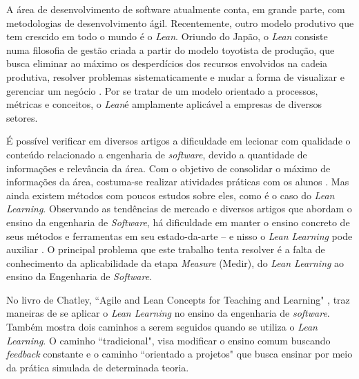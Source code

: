 A área de desenvolvimento de software atualmente conta, em grande parte, com metodologias de desenvolvimento ágil. Recentemente, outro modelo produtivo que tem crescido em todo o mundo é o \textit{Lean}. Oriundo do Japão, o \textit{Lean} consiste numa filosofia de gestão criada a partir do modelo toyotista de produção, que busca eliminar ao máximo os desperdícios dos recursos envolvidos na cadeia produtiva, resolver problemas sistematicamente e mudar a forma de visualizar e gerenciar um negócio \cite{poth2019lean}. Por se tratar de um modelo orientado a processos, métricas e conceitos, o \textit{Lean}é amplamente aplicável a empresas de diversos setores.

É possível verificar em diversos artigos a dificuldade em lecionar com qualidade o conteúdo relacionado a engenharia de \textit{software}, devido a quantidade de informações e relevância da área. Com o objetivo de consolidar o máximo de informações da área, costuma-se realizar atividades práticas com os alunos \cite{EnsinoEng2014}. Mas ainda existem métodos com poucos estudos sobre eles, como é o caso do \textit{Lean Learning}.
Observando as tendências de mercado e diversos artigos que abordam o ensino da engenharia de \textit{Software}, há dificuldade em manter o ensino concreto de seus métodos e ferramentas em seu estado-da-arte -- e nisso o \textit{Lean Learning} pode auxiliar \cite{chatley2017lean}. O principal problema que este trabalho tenta resolver é a falta de conhecimento da aplicabilidade da etapa \textit{Measure} (Medir), do \textit{Lean Learning} ao ensino da Engenharia de \textit{Software}.

No livro de Chatley, ``Agile and Lean Concepts for Teaching and Learning" \nocite{ChatleyBook2019}, traz maneiras de se aplicar o \textit{Lean Learning} no ensino da engenharia de \textit{software}. Também mostra dois caminhos a serem seguidos quando se utiliza o \textit{Lean Learning}. O caminho ``tradicional", visa modificar o ensino comum buscando \textit{feedback} constante e o caminho ``orientado a projetos" que busca ensinar por meio da prática simulada de determinada teoria.

